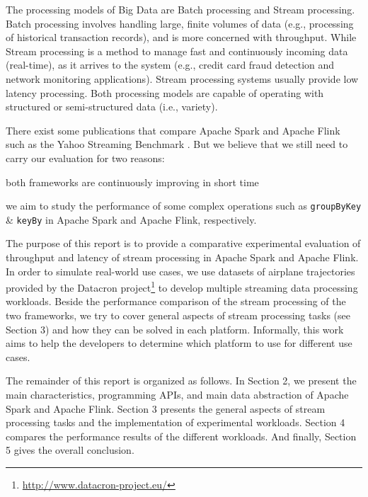 \documentclass[]{article}
\begin{document}
\par The processing models of Big Data are Batch processing and Stream processing. Batch processing involves handling  large, finite volumes of data (e.g., processing of historical transaction records), and is more concerned with throughput. While Stream processing  is a method to manage fast and continuously incoming data (real-time), as it arrives to the system (e.g., credit card fraud detection and network monitoring applications). Stream processing systems usually  provide low latency processing. Both processing models are capable of operating with structured or semi-structured data (i.e., variety).

\par There exist some publications that compare Apache Spark and Apache Flink
 such as the Yahoo Streaming Benchmark \cite{yahoo}. But we believe that we still need to carry our evaluation for two reasons: \begin{enumerate*}[label=(\roman*)]
\item both frameworks are continuously improving in short time 
\item we aim to study the performance of some complex operations such as \texttt{groupByKey} \& \texttt{keyBy} in Apache Spark and Apache Flink, respectively.
\end{enumerate*}

 

\par The purpose of this report is to provide a comparative experimental evaluation of throughput and latency of stream processing in Apache Spark and Apache Flink. In order to simulate real-world use cases, we use datasets of airplane trajectories provided by the  Datacron project\footnote{\url{http://www.datacron-project.eu/}} to develop multiple streaming data processing workloads. Beside the performance comparison of the stream processing of the two frameworks, we try to cover general aspects of stream processing tasks (see Section 3) and how they can be solved in each platform. Informally,  this work aims to help the developers to determine which platform to use for different use cases. 


\par The remainder of this report is organized as follows.
In Section 2, we present the main characteristics, programming APIs, and main data abstraction of Apache Spark and Apache Flink. Section 3  presents the general aspects of stream processing tasks and the implementation of experimental workloads. Section 4
compares the performance results of the different workloads. And finally, Section 5 gives the overall conclusion.
\end{document}

